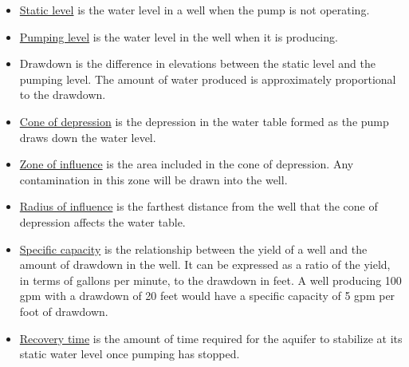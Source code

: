 \begin{itemize}
\item \ul{Static level}  is the water level in a well when the pump is not operating.
\item \ul{Pumping level}  is the water level in the well when it is producing.
\item Drawdown   is the difference in elevations between the static level and the pumping level. The amount of water produced is approximately proportional to the drawdown.
\item \ul{Cone of depression}   is the depression in the water table formed as the pump draws down the water level.
\item \ul{Zone of influence}  is the area included in the cone of depression.  Any contamination in this zone will be drawn into the well.
\item \ul{Radius of influence}  is the farthest distance from the well that the cone
of depression affects the water table.
\item \ul{Specific capacity} is the relationship between the yield of a well and the amount of drawdown in the well. It can be expressed as a ratio of the yield, in terms of gallons per minute, to the drawdown in feet. A well producing 100 gpm with a drawdown of 20 feet would have a specific capacity of 5 gpm per foot of drawdown.














\item \ul{Recovery time} is the amount of time required for the aquifer to stabilize at its static water level once pumping has stopped.
\end{itemize}
